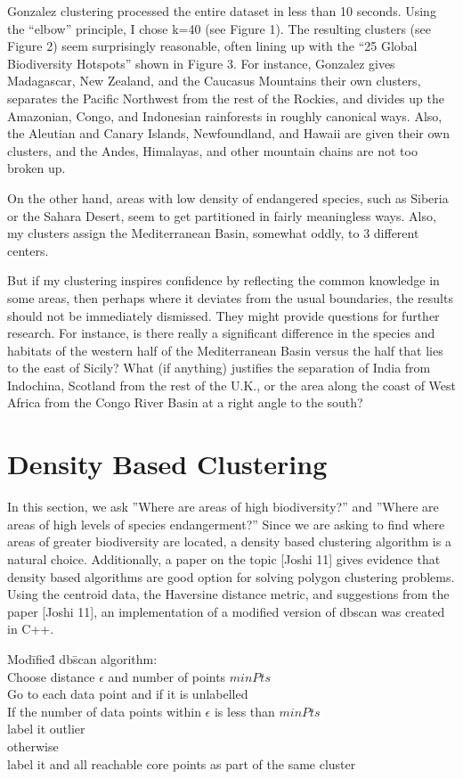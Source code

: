 \documentclass[11pt, fullpage,letterpaper]{article}
\renewcommand{\cite}[1]{[#1]}
\begin{document}
		Gonzalez clustering processed the entire dataset in less than 10 seconds. Using the “elbow” principle, I chose k=40 (see Figure 1). The resulting clusters (see Figure 2) seem surprisingly reasonable, often lining up with the “25 Global Biodiversity Hotspots” shown in Figure 3. For instance, Gonzalez gives Madagascar, New Zealand, and the Caucasus Mountains their own clusters, separates the Pacific Northwest from the rest of the Rockies, and divides up the Amazonian, Congo, and Indonesian rainforests in roughly canonical ways. Also, the Aleutian and Canary Islands, Newfoundland, and Hawaii are given their own clusters, and the Andes, Himalayas, and other mountain chains are not too broken up. 
	
		On the other hand, areas with low density of endangered species, such as Siberia or the Sahara Desert, seem to get partitioned in fairly meaningless ways. Also, my clusters assign the Mediterranean Basin, somewhat oddly, to 3 different centers. 
	
		But if my clustering inspires confidence by reflecting the common knowledge in some areas, then perhaps where it deviates from the usual boundaries, the results should not be immediately dismissed. They might provide questions for further research. For instance, is there really a significant difference in the species and habitats of the western half of the Mediterranean Basin versus the half that lies to the east of Sicily? What (if anything) justifies the separation of India from Indochina, Scotland from the rest of the U.K., or the area along the coast of West Africa from the Congo River Basin at a right angle to the south?
	
	\section{Density Based Clustering}
		In this section, we ask ''Where are areas of high biodiversity?'' and ''Where are areas of high levels of species endangerment?'' Since we are asking to find where areas of greater biodiversity are located, a density based clustering algorithm is a natural choice. Additionally, a paper on the topic \cite{Joshi 11} gives evidence that density based algorithms are good option for solving polygon clustering problems. Using the centroid data, the Haversine distance metric, and suggestions from the paper \cite{Joshi 11}, an implementation of a modified version of dbscan was created in C++.
		\begin{tabbing}
			Mod\= ifie\= d db\= scan algorithm:\\
			\> Choose distance $\epsilon$ and number of points $minPts$\\
			\> Go to each data point and if it is unlabelled\\
			\> \> If the number of data points within $\epsilon$ is less than $minPts$\\
			\> \> \> label it outlier\\
			\> \> otherwise\\
			\> \> \> label it and all reachable core points as part of the same cluster\\
		\end{tabbing}
\end{document}
